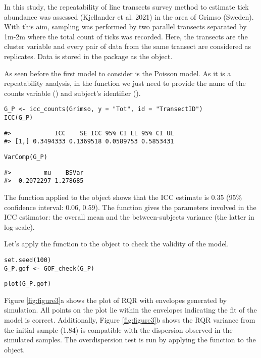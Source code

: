In this study, the repeatability of line transects survey method to estimate tick abundance was assessed (Kjellander et al. 2021) in the area of Grimso (Sweden). With this aim, sampling was performed by two parallel transects separated by 1m-2m where the total count of ticks was recorded. Here, the transects are the cluster variable and every pair of data from the same transect are considered as replicates. Data is stored in the package as the  object.

As seen before the first model to consider is the Poisson model. As it is a repeatability analysis, in the  function we just need to provide the name of the counts variable () and subject's identifier ().

\begin{verbatim}
G_P <- icc_counts(Grimso, y = "Tot", id = "TransectID")
ICC(G_P)
\end{verbatim}

\begin{verbatim}
#>            ICC    SE ICC 95% CI LL 95% CI UL
#> [1,] 0.3494333 0.1369518 0.0589753 0.5853431
\end{verbatim}

\begin{verbatim}
VarComp(G_P)
\end{verbatim}

\begin{verbatim}
#>         mu    BSVar
#>  0.2072297 1.278685
\end{verbatim}

The function  applied to the  object shows that the ICC estimate is 0.35 (95\% confidence interval: 0.06, 0.59). The function  gives the parameters involved in the ICC estimator: the overall mean and the between-subjects variance (the latter in log-scale).

Let's apply the function  to the  object to check the validity of the model.

\begin{verbatim}
set.seed(100)
G_P.gof <- GOF_check(G_P)
\end{verbatim}

\begin{verbatim}
plot(G_P.gof)
\end{verbatim}

Figure \ref{fig:figure3}a shows the plot of RQR with envelopes generated by simulation. All points on the plot lie within the envelopes indicating the fit of the model is correct. Additionally, Figure \ref{fig:figure3}b shows the RQR variance from the initial sample (1.84) is compatible with the dispersion observed in the simulated samples. The overdispersion test is run by applying the function  to the  object.

